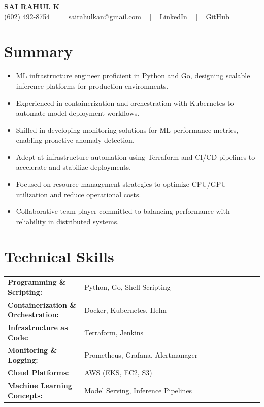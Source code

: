\documentclass[letterpaper,11pt]{article}
\newcommand{\resumeItem}[1]{
  \item\footnotesize{
    {#1 \vspace{-2pt}}
  }
}
\newcommand{\resumeItemListStart}{\begin{itemize}[leftmargin=*]}
\newcommand{\resumeItemListEnd}{\end{itemize}\vspace{-5pt}}
\begin{document}
\begin{center}
    {\fontsize{14pt}{12pt}\selectfont \textbf{\MakeUppercase{Sai Rahul K}}}\\ \vspace{2pt}
    \fontsize{10pt}{12pt}\selectfont (602) 492-8754 ~ | ~ \href{mailto:sairahulkan@gmail.com}{sairahulkan@gmail.com} ~ | ~
    \href{https://www.linkedin.com/in/rq123/}{\color{blue}\underline{LinkedIn}} ~ | ~
    \href{https://github.com/kanrahuldo}{\color{blue}\underline{GitHub}}~
    \vspace{-8pt}
\end{center}

\section{Summary}
\fontsize{9pt}{10pt}\selectfont
\resumeItemListStart
    \resumeItem{ML infrastructure engineer proficient in Python and Go, designing scalable inference platforms for production environments.}
    \resumeItem{Experienced in containerization and orchestration with Kubernetes to automate model deployment workflows.}
    \resumeItem{Skilled in developing monitoring solutions for ML performance metrics, enabling proactive anomaly detection.}
    \resumeItem{Adept at infrastructure automation using Terraform and CI/CD pipelines to accelerate and stabilize deployments.}
    \resumeItem{Focused on resource management strategies to optimize CPU/GPU utilization and reduce operational costs.}
    \resumeItem{Collaborative team player committed to balancing performance with reliability in distributed systems.}
\resumeItemListEnd
\vspace{-6pt}

\section{Technical Skills}
    \vspace{-14pt}
    \begin{tabular}{p{0.3\linewidth} p{0.7\linewidth}}
        \textbf{Programming \& Scripting:} & Python, Go, Shell Scripting \\
        \textbf{Containerization \& Orchestration:} & Docker, Kubernetes, Helm \\
        \textbf{Infrastructure as Code:} & Terraform, Jenkins \\
        \textbf{Monitoring \& Logging:} & Prometheus, Grafana, Alertmanager \\
        \textbf{Cloud Platforms:} & AWS (EKS, EC2, S3) \\
        \textbf{Machine Learning Concepts:} & Model Serving, Inference Pipelines \\
    \end{tabular}
\end{document}
